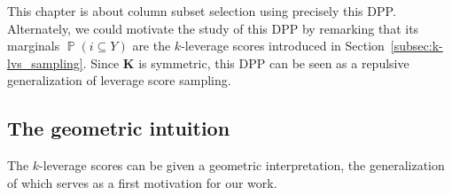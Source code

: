 \documentclass[twoside,11pt]{book}
\numberwithin{theorem}{chapter}
\numberwithin{definition}{chapter}
\numberwithin{proposition}{chapter}
\numberwithin{corollary}{chapter}
\numberwithin{example}{chapter}
\numberwithin{lemma}{chapter}
\numberwithin{assumption}{chapter}
\numberwithin{equation}{chapter}
\numberwithin{figure}{chapter}
\DeclareMathOperator{\Prb}{\mathbb{P}}
\begin{document}
This chapter is about column subset selection using precisely this DPP. Alternately, we could motivate the study of this DPP by remarking that its marginals $\Prb({i}\subseteq Y)$ are the $k$-leverage scores introduced in Section~\ref{subsec:k-lvs_sampling}. Since $\bm K$ is symmetric, this DPP can be seen as a repulsive generalization of leverage score sampling.


\subsection{The geometric intuition}\label{subsec:klv_intuition}
The $k$-leverage scores can be given a geometric interpretation, the generalization of which serves as a first motivation for our work.
\end{document}
